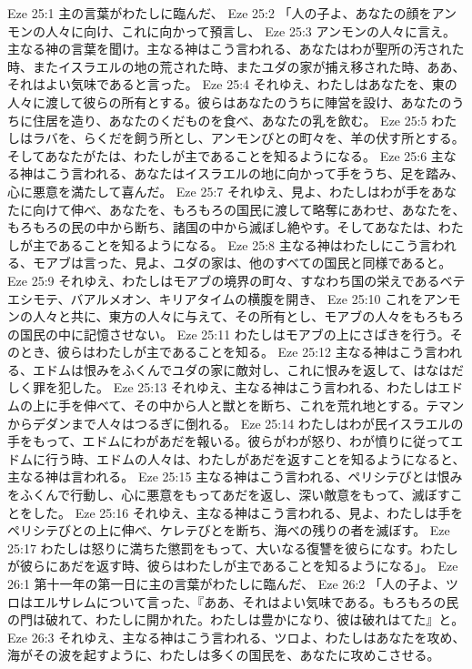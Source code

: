 Eze 25:1  主の言葉がわたしに臨んだ、
Eze 25:2  「人の子よ、あなたの顔をアンモンの人々に向け、これに向かって預言し、
Eze 25:3  アンモンの人々に言え。主なる神の言葉を聞け。主なる神はこう言われる、あなたはわが聖所の汚された時、またイスラエルの地の荒された時、またユダの家が捕え移された時、ああ、それはよい気味であると言った。
Eze 25:4  それゆえ、わたしはあなたを、東の人々に渡して彼らの所有とする。彼らはあなたのうちに陣営を設け、あなたのうちに住居を造り、あなたのくだものを食べ、あなたの乳を飲む。
Eze 25:5  わたしはラバを、らくだを飼う所とし、アンモンびとの町々を、羊の伏す所とする。そしてあなたがたは、わたしが主であることを知るようになる。
Eze 25:6  主なる神はこう言われる、あなたはイスラエルの地に向かって手をうち、足を踏み、心に悪意を満たして喜んだ。
Eze 25:7  それゆえ、見よ、わたしはわが手をあなたに向けて伸べ、あなたを、もろもろの国民に渡して略奪にあわせ、あなたを、もろもろの民の中から断ち、諸国の中から滅ぼし絶やす。そしてあなたは、わたしが主であることを知るようになる。
Eze 25:8  主なる神はわたしにこう言われる、モアブは言った、見よ、ユダの家は、他のすべての国民と同様であると。
Eze 25:9  それゆえ、わたしはモアブの境界の町々、すなわち国の栄えであるベテエシモテ、バアルメオン、キリアタイムの横腹を開き、
Eze 25:10  これをアンモンの人々と共に、東方の人々に与えて、その所有とし、モアブの人々をもろもろの国民の中に記憶させない。
Eze 25:11  わたしはモアブの上にさばきを行う。そのとき、彼らはわたしが主であることを知る。
Eze 25:12  主なる神はこう言われる、エドムは恨みをふくんでユダの家に敵対し、これに恨みを返して、はなはだしく罪を犯した。
Eze 25:13  それゆえ、主なる神はこう言われる、わたしはエドムの上に手を伸べて、その中から人と獣とを断ち、これを荒れ地とする。テマンからデダンまで人々はつるぎに倒れる。
Eze 25:14  わたしはわが民イスラエルの手をもって、エドムにわがあだを報いる。彼らがわが怒り、わが憤りに従ってエドムに行う時、エドムの人々は、わたしがあだを返すことを知るようになると、主なる神は言われる。
Eze 25:15  主なる神はこう言われる、ペリシテびとは恨みをふくんで行動し、心に悪意をもってあだを返し、深い敵意をもって、滅ぼすことをした。
Eze 25:16  それゆえ、主なる神はこう言われる、見よ、わたしは手をペリシテびとの上に伸べ、ケレテびとを断ち、海べの残りの者を滅ぼす。
Eze 25:17  わたしは怒りに満ちた懲罰をもって、大いなる復讐を彼らになす。わたしが彼らにあだを返す時、彼らはわたしが主であることを知るようになる」。
Eze 26:1  第十一年の第一日に主の言葉がわたしに臨んだ、
Eze 26:2  「人の子よ、ツロはエルサレムについて言った、『ああ、それはよい気味である。もろもろの民の門は破れて、わたしに開かれた。わたしは豊かになり、彼は破れはてた』と。
Eze 26:3  それゆえ、主なる神はこう言われる、ツロよ、わたしはあなたを攻め、海がその波を起すように、わたしは多くの国民を、あなたに攻めこさせる。
